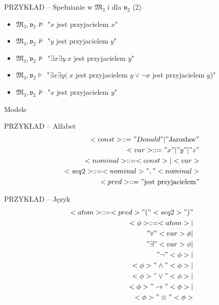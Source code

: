 \documentclass{beamer}
\begin{document}
\begin{frame}{PRZYKŁAD -- Spełnianie w $\mathfrak{M}_3$ i dla $\mathfrak{v}_2$ (2)}
%
\begin{itemize}
\item $\mathfrak{M}_3,\mathfrak{v}_2 \not \vDash$ "$x$ jest przyjacielem $x$"%
\item $\mathfrak{M}_3,\mathfrak{v}_2 \not \vDash$ "$y$ jest przyjacielem $y$"%
\item $\mathfrak{M}_3,\mathfrak{v}_2 \not \vDash$ "$\exists x \exists y ~x$ jest przyjacielem $y$"%
\item $\mathfrak{M}_3,\mathfrak{v}_2 \vDash$ "$\exists x \exists y ( ~x$ jest przyjacielem $y \lor \neg x$ jest przyjacielem $y$)"%
\item $\mathfrak{M}_3,\mathfrak{v}_2 \not \vDash$ "$x$ jest przyjacielem $y$"
\end{itemize}
\end{frame}


\begin{frame}{Modele}
\end{frame}

\begin{frame}{PRZYKŁAD -- Alfabet}
%
\begin{eqnarray}
<const> ::= "Donald" | "\text{Jarosław}" \\ %
<var> ::= "x" | "y" | "z" \\ %
<nominal> ::= <const> | <var> \\ %
<seq2> ::= <nominal>","<nominal> \\ %
<pred> ::= "\text{jest przyjacielem}"
\end{eqnarray}
\end{frame}

\begin{frame}{PRZYKŁAD -- Język}
%
\begin{eqnarray}
<atom> ::= <pred>"("<seq2>")" \\
%
<\phi> ::= <atom> | \nonumber  \\ 
"\forall"<var> \phi | \nonumber  \\
"\exists"<var> \phi | \nonumber  \\
"\neg" <\phi> | \nonumber  \\
<\phi> "\land" <\phi> | \nonumber \\
<\phi> "\lor" <\phi> | \nonumber  \\
<\phi> "\to" <\phi> | \nonumber  \\
<\phi> "\equiv" <\phi>
\end{eqnarray}
\end{frame}
\end{document}
